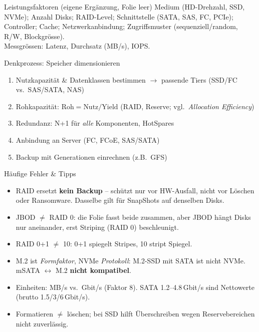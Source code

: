 \documentclass[a4paper, fontsize=7pt]{scrartcl}
\begin{document}
\begin{subbox}{Leistungsfaktoren (eigene Ergänzung, Folie leer)}
Medium (HD-Drehzahl, SSD, NVMe); Anzahl Disks; RAID-Level; Schnittstelle (SATA,
SAS, FC, PCIe); Controller; Cache; Netzwerkanbindung; Zugriffsmuster
(sequenziell/random, R/W, Blockgrösse).\\
Messgrössen: Latenz, Durchsatz (MB/s), IOPS.
\end{subbox}

\begin{subbox}{Denkprozess: Speicher dimensionieren}
\begin{enumerate}
    \item Nutzkapazität \& Datenklassen bestimmen $\to$ passende Tiers
          (SSD/FC vs.\ SAS/SATA, NAS)
    \item Rohkapazität: $\text{Roh} = \text{Nutz} / \text{Yield}$ (RAID,
          Reserve; vgl.\ \emph{Allocation Efficiency})
    \item Redundanz: N+1 für \emph{alle} Komponenten, HotSpares
    \item Anbindung an Server (FC, FCoE, SAS/SATA)
    \item Backup mit Generationen einrechnen (z.B.\ GFS)
\end{enumerate}
\end{subbox}

\begin{subbox}{Häufige Fehler \& Tipps}
\begin{itemize}
    \item RAID ersetzt \textbf{kein Backup} -- schützt nur vor HW-Ausfall, nicht
          vor Löschen oder Ransomware. Dasselbe gilt für SnapShots auf
          denselben Disks.
    \item JBOD $\neq$ RAID 0: die Folie fasst beide zusammen, aber JBOD hängt
          Disks nur aneinander, erst Striping (RAID 0) beschleunigt.
    \item RAID 0+1 $\neq$ 10: 0+1 spiegelt Stripes, 10 stript Spiegel.
    \item M.2 ist \emph{Formfaktor}, NVMe \emph{Protokoll}: M.2-SSD mit SATA ist
          nicht NVMe. mSATA $\leftrightarrow$ M.2 \textbf{nicht kompatibel}.
    \item Einheiten: MB/s vs.\ Gbit/s (Faktor 8). SATA 1.2--4.8\,Gbit/s sind
          Nettowerte (brutto 1.5/3/6\,Gbit/s).
    \item Formatieren $\neq$ löschen; bei SSD hilft Überschreiben wegen
          Reservebereichen nicht zuverlässig.
\end{itemize}
\end{subbox}
\end{document}
